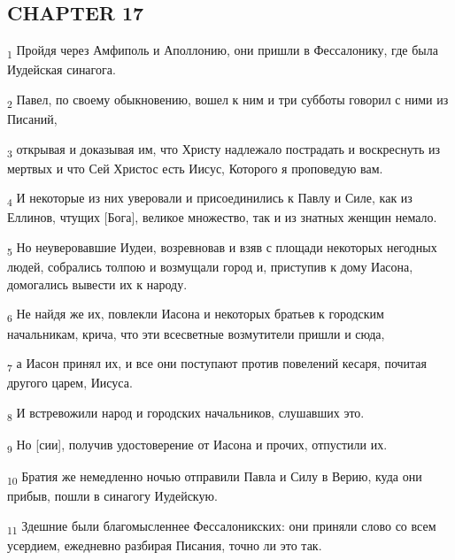 \subsection{CHAPTER 17}
\begin{tcolorbox}
\textsubscript{1} Пройдя через Амфиполь и Аполлонию, они пришли в Фессалонику, где была Иудейская синагога.
\end{tcolorbox}
\begin{tcolorbox}
\textsubscript{2} Павел, по своему обыкновению, вошел к ним и три субботы говорил с ними из Писаний,
\end{tcolorbox}
\begin{tcolorbox}
\textsubscript{3} открывая и доказывая им, что Христу надлежало пострадать и воскреснуть из мертвых и что Сей Христос есть Иисус, Которого я проповедую вам.
\end{tcolorbox}
\begin{tcolorbox}
\textsubscript{4} И некоторые из них уверовали и присоединились к Павлу и Силе, как из Еллинов, чтущих [Бога], великое множество, так и из знатных женщин немало.
\end{tcolorbox}
\begin{tcolorbox}
\textsubscript{5} Но неуверовавшие Иудеи, возревновав и взяв с площади некоторых негодных людей, собрались толпою и возмущали город и, приступив к дому Иасона, домогались вывести их к народу.
\end{tcolorbox}
\begin{tcolorbox}
\textsubscript{6} Не найдя же их, повлекли Иасона и некоторых братьев к городским начальникам, крича, что эти всесветные возмутители пришли и сюда,
\end{tcolorbox}
\begin{tcolorbox}
\textsubscript{7} а Иасон принял их, и все они поступают против повелений кесаря, почитая другого царем, Иисуса.
\end{tcolorbox}
\begin{tcolorbox}
\textsubscript{8} И встревожили народ и городских начальников, слушавших это.
\end{tcolorbox}
\begin{tcolorbox}
\textsubscript{9} Но [сии], получив удостоверение от Иасона и прочих, отпустили их.
\end{tcolorbox}
\begin{tcolorbox}
\textsubscript{10} Братия же немедленно ночью отправили Павла и Силу в Верию, куда они прибыв, пошли в синагогу Иудейскую.
\end{tcolorbox}
\begin{tcolorbox}
\textsubscript{11} Здешние были благомысленнее Фессалоникских: они приняли слово со всем усердием, ежедневно разбирая Писания, точно ли это так.
\end{tcolorbox}
